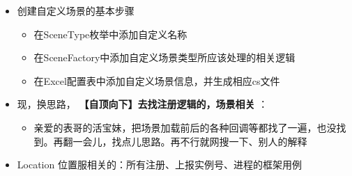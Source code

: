 \documentclass[9pt, b5paper]{article}
\begin{document}
\begin{itemize}
\begin{itemize}
\item 创建自定义场景的基本步骤
\begin{itemize}
\item 在SceneType枚举中添加自定义名称
\item 在SceneFactory中添加自定义场景类型所应该处理的相关逻辑
\item 在Excel配置表中添加自定义场景信息，并生成相应cs文件
\end{itemize}
\item 现，换思路， \textbf{【自顶向下】去找注册逻辑的，场景相关} ：
\begin{itemize}
\item 亲爱的表哥的活宝妹，把场景加载前后的各种回调等都找了一遍，也没找到。再翻一会儿，找点儿思路。再不行就网搜一下、别人的解释
\end{itemize}
\item Location 位置服相关的：所有注册、上报实例号、进程的框架用例
\end{itemize}


\end{itemize}
\end{document}

